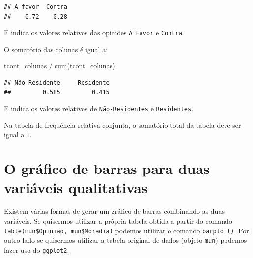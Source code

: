\documentclass[
]{book}
\newenvironment{Shaded}{\begin{snugshade}}{\end{snugshade}}
\newcommand{\FunctionTok}[1]{\textcolor[rgb]{0.00,0.00,0.00}{#1}}
\newcommand{\NormalTok}[1]{#1}
\newcommand{\SpecialCharTok}[1]{\textcolor[rgb]{0.00,0.00,0.00}{#1}}
\begin{document}
\begin{verbatim}
## A favor  Contra 
##    0.72    0.28
\end{verbatim}

E indica os valores relativos das opiniões \texttt{A\ Favor} e \texttt{Contra}.

O somatório das colunas é igual a:

\begin{Shaded}
\begin{Highlighting}[]
\NormalTok{tcont\_colunas }\SpecialCharTok{/} \FunctionTok{sum}\NormalTok{(tcont\_colunas)}
\end{Highlighting}
\end{Shaded}

\begin{verbatim}
## Não-Residente     Residente 
##         0.585         0.415
\end{verbatim}

E indica os valores relativos de \texttt{Não-Residentes} e \texttt{Residentes}.

Na tabela de frequência relativa conjunta, o somatório total da tabela deve ser igual a \(1\).

\hypertarget{o-gruxe1fico-de-barras-para-duas-variuxe1veis-qualitativas}{%
\section{O gráfico de barras para duas variáveis qualitativas}\label{o-gruxe1fico-de-barras-para-duas-variuxe1veis-qualitativas}}

Existem várias formas de gerar um gráfico de barras combinando as duas variáveis. Se quisermos utilizar a própria tabela obtida a partir do comando \texttt{table(mun\$Opiniao,\ mun\$Moradia)} podemos utilizar o comando \texttt{barplot()}. Por outro lado se quisermos utilizar a tabela original de dados (objeto \texttt{mun}) podemos fazer uso do \texttt{ggplot2}.
\end{document}
